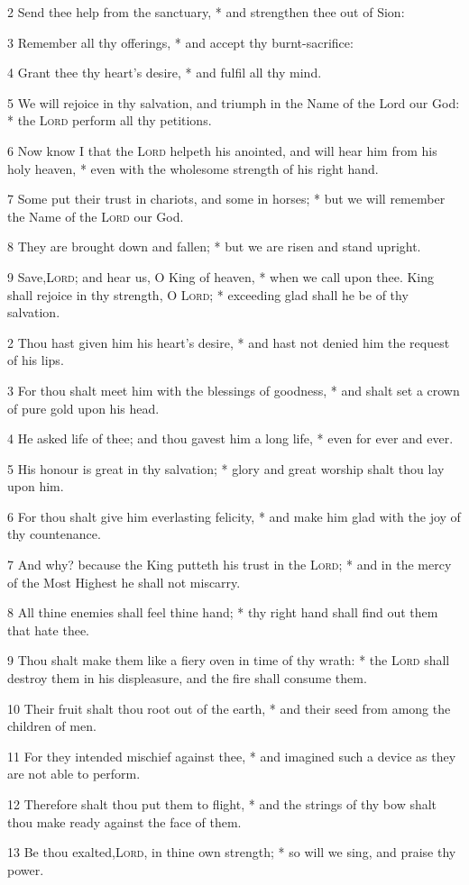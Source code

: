 2 Send thee help from the sanctuary, * and strengthen thee out of Sion:\par
3 Remember all thy offerings, * and accept thy burnt-sacrifice:\par
4 Grant thee thy heart's desire, * and fulfil all thy mind.\par
5 We will rejoice in thy salvation, and triumph in the Name of the Lord our God: * the {\textsc{Lord}} perform all thy petitions.\par
6 Now know I that the {\textsc{Lord}} helpeth his anointed, and will hear him from his holy heaven, * even with the wholesome strength of his right hand.\par
7 Some put their trust in chariots, and some in horses; * but we will remember the Name of the {\textsc{Lord}} our God.\par
8 They are brought down and fallen; * but we are risen and stand upright.\par
9 Save,{\textsc{Lord}}; and hear us, O King of heaven, * when we call upon thee.
 King shall rejoice in thy strength, O {\textsc{Lord}}; * exceeding glad shall he be of thy salvation.\par
2 Thou hast given him his heart's desire, * and hast not denied him the request of his lips.\par
3 For thou shalt meet him with the blessings of goodness, * and shalt set a crown of pure gold upon his head.\par
4 He asked life of thee; and thou gavest him a long life, * even for ever and ever.\par
5 His honour is great in thy salvation; * glory and great worship shalt thou lay upon him.\par
6 For thou shalt give him everlasting felicity, * and make him glad with the joy of thy countenance.\par
7 And why? because the King putteth his trust in the {\textsc{Lord}}; * and in the mercy of the Most Highest he shall not miscarry.\par
8 All thine enemies shall feel thine hand; * thy right hand shall find out them that hate thee.\par
9 Thou shalt make them like a fiery oven in time of thy wrath: * the {\textsc{Lord}} shall destroy them in his displeasure, and the fire shall consume them.\par
10 Their fruit shalt thou root out of the earth, * and their seed from among the children of men.\par
11 For they intended mischief against thee, * and imagined such a device as they are not able to perform.\par
12 Therefore shalt thou put them to flight, * and the strings of thy bow shalt thou make ready against the face of them.\par
13 Be thou exalted,{\textsc{Lord}}, in thine own strength; * so will we sing, and praise thy power.
